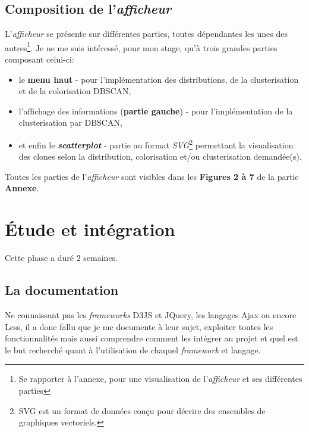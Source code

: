\documentclass[12pt]{report}
\begin{document}
\begin{spacing}{1.2}
\subsection{Composition de l'\textit{afficheur}}

L'\textit{afficheur} se présente sur différentes parties, toutes dépendantes les unes des autres\footnote{Se rapporter à l'annexe, pour une visualisation de l'\textit{afficheur} et ses différentes parties}.
\newline Je ne me suis intéressé, pour mon stage, qu'à trois grandes parties composant celui-ci:
\begin{itemize}
\item{le \textbf{menu haut} - pour l'implémentation des distributions, de la clusterisation et de la colorisation DBSCAN,}
\item{l'affichage des informations (\textbf{partie gauche}) - pour l'implémentation de la clusterisation par DBSCAN,}
\item{et enfin le \textbf{\textit{scatterplot}} - partie au format \textit{SVG}\footnote{SVG est un format de données conçu pour décrire des ensembles de graphiques vectoriels.} permettant la visualisation des clones selon la distribution, colorisation et/ou clusterisation demandée(s).}
\end{itemize}
Toutes les parties de l'\textit{afficheur} sont visibles dans les \textbf{Figures 2 à 7} de la partie \textbf{Annexe}.

\section{Étude et intégration}

Cette phase a duré 2 semaines.

\subsection{La documentation}
Ne connaissant pas les \textit{frameworks} D3JS et JQuery, les langages Ajax ou encore Less, il a donc fallu que je me documente à leur sujet, exploiter toutes les fonctionnalités mais aussi comprendre comment les intégrer au projet et quel est le but recherché quant à l'utilisation de chaquel \textit{framework} et langage.


\end{spacing}
\end{document}
